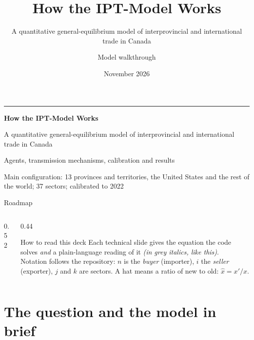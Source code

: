 \documentclass[aspectratio=169,9pt,t]{beamer}
\title[IPT-Model]{How the IPT-Model Works}
\subtitle{A quantitative general-equilibrium model of interprovincial and
international trade in Canada}
\author{Model walkthrough}
\date{November 2026}
\newcommand{\h}[1]{\hat{#1}}
\newcommand{\plain}[1]{{\color{ipgrey}\small\itshape #1}}
\begin{document}
\begin{frame}
  \vspace{2.2em}
  {\color{ipblue}\rule{0.18\textwidth}{2pt}}\par\medskip
  {\Huge\bfseries\color{ipnavy}How the IPT-Model Works\par}
  \medskip
  {\large\color{ipgrey}A quantitative general-equilibrium model of
  interprovincial and international trade in Canada\par}
  \vfill
  {\small Agents, transmission mechanisms, calibration and results\par}
  \smallskip
  {\footnotesize\color{ipgrey}Main configuration: 13 provinces and territories,
  the United States and the rest of the world; 37 sectors; calibrated to 2022\par}
  \vspace{1.5em}
\end{frame}

\begin{frame}{Roadmap}
  \begin{columns}[T]
    \begin{column}{0.52\textwidth}
      \tableofcontents
    \end{column}
    \begin{column}{0.44\textwidth}
      \begin{block}{How to read this deck}
        \small
        Each technical slide gives the equation the code solves
        \emph{and} a plain-language reading of it
        \plain{(in grey italics, like this)}.\\[0.5em]
        Notation follows the repository: $n$ is the \emph{buyer}
        (importer), $i$ the \emph{seller} (exporter), $j$ and $k$ are sectors.
        A hat means a ratio of new to old: $\h x = x'/x$.
      \end{block}
    \end{column}
  \end{columns}
\end{frame}

\section{The question and the model in brief}
\end{document}
